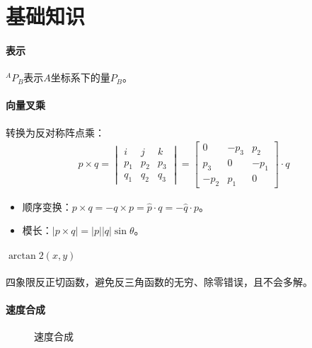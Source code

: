 \documentclass[
12pt, %
a4paper, 
oneside, %
headinclude,footinclude, %
]{scrartcl}
\title{\normalfont\spacedallcaps{机器人学导论}}
\date{}
\begin{document}
\maketitle
\newpage
\tableofcontents 
\newpage
\listoffigures
\listoftables
\listoftips
\newpage
\section{基础知识}
\paragraph{表示}
$ ^A P_B $表示$ A $坐标系下的量$ P_B $。
\paragraph{向量叉乘}
转换为反对称阵点乘：
\begin{align*}
p \times q
= \begin{vmatrix} i & j & k \\ p_1 & p_2 & p_3 \\ q_1 & q_2 & q_3 \end{vmatrix}
= \begin{bmatrix} 0 & -p_3 & p_2 \\ p_3 & 0 & -p_1 \\ -p_2 & p_1 & 0 \end{bmatrix} \cdot q
\end{align*}

\begin{itemize}
\item 顺序变换：$ p \times q = -q \times p = \hat{p} \cdot q = -\hat{q} \cdot p $。
\item 模长：$ |p \times q| = |p||q|\sin\theta $。
\end{itemize}
\paragraph{$ \arctan 2(x, y) $}
四象限反正切函数，避免反三角函数的无穷、除零错误，且不会多解。
\paragraph{速度合成}
\begin{figure}[H]
\centering
{} \quad
{}
\caption[速度合成]{速度合成}
\end{figure}
\end{document}
